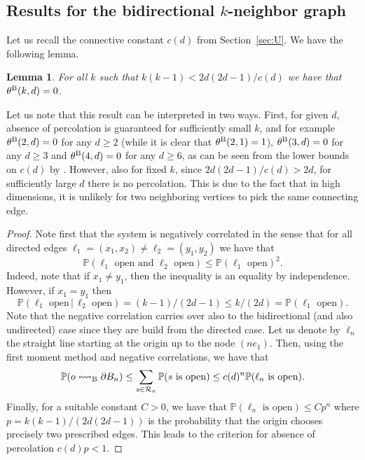 \documentclass[oneside]{amsart}
\newtheorem{lemma}[theorem]{Lemma}
\theoremstyle{definition}
\renewcommand{\P}{\mathbb{P}}
\newcommand{\1}{\mathbbm{1}}
\newcommand{\0}{\mathbf{o}}
\numberwithin{equation}{section}
\begin{document}
\subsection{Results for the bidirectional $k$-neighbor graph}\label{sec:B}
Let us recall the connective constant $c(d)$ from Section~\ref{sec:U}. We have the following lemma.
\begin{lemma}\label{lemma-Bnoperc}
For all $k$ such that $k(k-1)<2d(2d-1)/c(d)$ we have that $\theta^{\rm B}(k,d)=0$.
\end{lemma}
Let us note that this result can be interpreted in two ways. First, for given $d$, absence of percolation is guaranteed for sufficiently small $k$, and for example $\theta^{\rm B}(2,d)=0$ for any $d\geq 2$ (while it is clear that $\theta^{\rm B}(2,1)=1$), $\theta^{\rm B}(3,d)=0$ for any $d \geq 3$ and $\theta^{\rm B}(4,d)=0$ for any $d \geq 6$, as can be seen from the lower bounds on $c(d)$ by \cite{HSS}. However, also for fixed $k$, since $2d(2d-1)/c(d)>2d$, for sufficiently large $d$ there is no percolation. This is due to the fact that in high dimensions, it is unlikely for two neighboring vertices to pick the same connecting edge. 

\begin{proof}
Note first that the system is negatively correlated in the sense that for all directed edges $\ell_1=(x_1,x_2)\neq\ell_2=(y_1,y_2)$ we have that
$$
\mathbb P(\ell_1\text{ open and }\ell_2\text{ open})\le \mathbb P(\ell_1\text{ open})^2.
$$
Indeed, note that if $x_1\neq y_1$, then the inequality is an equality by independence. However, if $x_1=y_1$ then 
$$
\mathbb P(\ell_1\text{ open}\,|\,\ell_2\text{ open})=(k-1)/(2d-1)\le k/(2d)=\mathbb P(\ell_1\text{ open}).
$$
Note that the negative correlation carries over also to the bidirectional (and also undirected) case since they are build from the directed case. Let us denote by $\ell_n$ the straight line starting at the origin up to the node $(ne_1)$. Then, using the first moment method and negative correlations, we have that 
\begin{align*}
\P(o\leftrightsquigarrow_{\rm B}\partial B_n)\le \sum_{s\in \mathcal R_n}\P(s\text{ is open})\le c(d)^n\P(\ell_n\text{ is open}).
\end{align*}
Finally, for a suitable constant $C>0$, we have that $\P(\ell_n\text{ is open})\le C p^n$ where $p=k(k-1)/(2d(2d-1))$ is the probability that the origin chooses precisely two prescribed edges. This leads to the criterion for absence of percolation $c(d)p<1$.
\end{proof}
\end{document}
